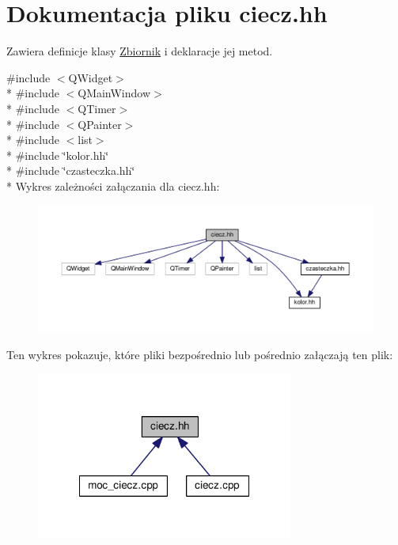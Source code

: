 \hypertarget{ciecz_8hh}{\section{Dokumentacja pliku ciecz.\-hh}
\label{ciecz_8hh}
}


Zawiera definicje klasy \hyperlink{class_zbiornik}{Zbiornik} i deklaracje jej metod.  


{\ttfamily \#include $<$Q\-Widget$>$}\\*
{\ttfamily \#include $<$Q\-Main\-Window$>$}\\*
{\ttfamily \#include $<$Q\-Timer$>$}\\*
{\ttfamily \#include $<$Q\-Painter$>$}\\*
{\ttfamily \#include $<$list$>$}\\*
{\ttfamily \#include \char`\"{}kolor.\-hh\char`\"{}}\\*
{\ttfamily \#include \char`\"{}czasteczka.\-hh\char`\"{}}\\*
Wykres zależności załączania dla ciecz.\-hh\-:\nopagebreak
\begin{figure}[H]
\begin{center}
\leavevmode
\includegraphics[width=350pt]{ciecz_8hh__incl}
\end{center}
\end{figure}
Ten wykres pokazuje, które pliki bezpośrednio lub pośrednio załączają ten plik\-:\nopagebreak
\begin{figure}[H]
\begin{center}
\leavevmode
\includegraphics[width=239pt]{ciecz_8hh__dep__incl}
\end{center}
\end{figure}

